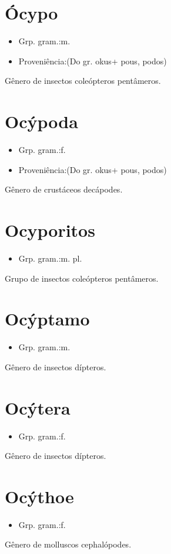 \section{Ócypo}
\begin{itemize}
\item {Grp. gram.:m.}
\end{itemize}
\begin{itemize}
\item {Proveniência:(Do gr. \textunderscore okus\textunderscore  + \textunderscore pous\textunderscore , \textunderscore podos\textunderscore )}
\end{itemize}
Gênero de insectos coleópteros pentâmeros.
\section{Ocýpoda}
\begin{itemize}
\item {Grp. gram.:f.}
\end{itemize}
\begin{itemize}
\item {Proveniência:(Do gr. \textunderscore okus\textunderscore  + \textunderscore pous\textunderscore , \textunderscore podos\textunderscore )}
\end{itemize}
Gênero de crustáceos decápodes.
\section{Ocyporitos}
\begin{itemize}
\item {Grp. gram.:m. pl.}
\end{itemize}
Grupo de insectos coleópteros pentâmeros.
\section{Ocýptamo}
\begin{itemize}
\item {Grp. gram.:m.}
\end{itemize}
Gênero de insectos dípteros.
\section{Ocýtera}
\begin{itemize}
\item {Grp. gram.:f.}
\end{itemize}
Gênero de insectos dípteros.
\section{Ocýthoe}
\begin{itemize}
\item {Grp. gram.:f.}
\end{itemize}
Gênero de molluscos cephalópodes.
